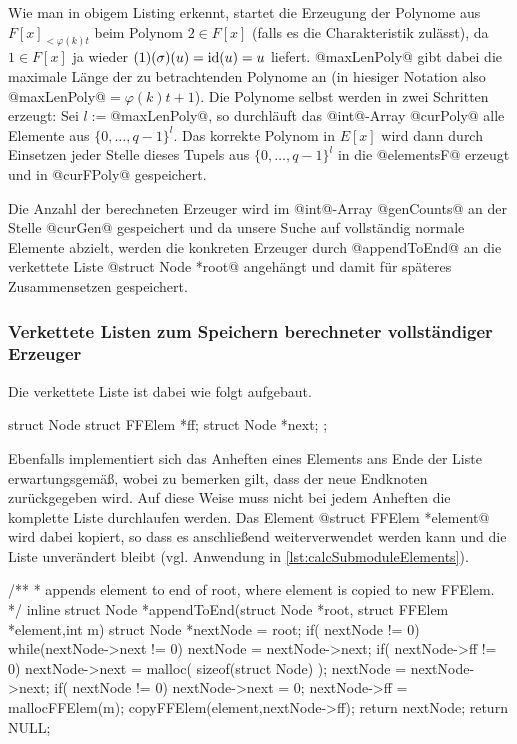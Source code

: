 Wie man in obigem Listing erkennt, startet die Erzeugung der Polynome aus 
$F[x]_{<\varphi(k)t}$ beim Polynom $2 \in F[x]$ (falls es die Charakteristik
zulässt), da $1\in F[x]$ ja wieder $(1)(\sigma)(u) = \operatorname{id}(u) = u$ liefert.
@maxLenPoly@ gibt dabei die maximale Länge der zu betrachtenden Polynome an (in
hiesiger Notation also @maxLenPoly@$= \varphi(k)t+1$). Die Polynome selbst
werden in zwei Schritten erzeugt: Sei $l := $@maxLenPoly@, so
durchläuft das @int@-Array @curPoly@ alle Elemente aus $\{0,\ldots,q-1\}^l$.
Das korrekte Polynom in $E[x]$ wird dann durch Einsetzen jeder Stelle 
dieses Tupels aus $\{0,\ldots,q-1\}^l$ in die @elementsF@ erzeugt und in 
@curFPoly@ gespeichert.

Die Anzahl der berechneten Erzeuger wird im @int@-Array @genCounts@ an der
Stelle @curGen@ gespeichert und da unsere Suche auf vollständig normale
Elemente abzielt, werden die konkreten Erzeuger durch @appendToEnd@ 
an die verkettete Liste @struct Node *root@ angehängt und 
damit für späteres Zusammensetzen gespeichert.


\subsubsection{Verkettete Listen zum Speichern berechneter vollständiger Erzeuger}

Die verkettete Liste ist dabei wie folgt aufgebaut.

\begin{ccode}[caption={[\texttt{struct Node} aus 
 \url{../Sage/enumeratePCNs.c}]Aus \url{../Sage/enumeratePCNs.c}},
  label=lst:structNode]
struct Node {
    struct FFElem *ff;
    struct Node *next;
};
\end{ccode}

Ebenfalls implementiert sich das Anheften eines Elements ans Ende der Liste 
erwartungsgemäß, wobei zu bemerken gilt, dass der neue Endknoten zurückgegeben 
wird.
Auf diese Weise muss nicht bei jedem Anheften die komplette Liste durchlaufen
werden. Das Element @struct FFElem *element@ wird dabei kopiert, so dass es
anschließend weiterverwendet werden kann und die Liste unverändert bleibt 
(vgl. Anwendung in \autoref{lst:calcSubmoduleElements}).

\begin{ccode}[caption={[\texttt{Node *appendToEnd} aus 
 \url{../Sage/enumeratePCNs.c}]Aus \url{../Sage/enumeratePCNs.c}},
  label=lst:appendToEnd]
/**
 * appends element to end of root, where element is copied to new FFElem.
 */
inline struct Node *appendToEnd(struct Node *root, struct FFElem *element,int m){
    struct Node *nextNode = root;
    if( nextNode != 0){
        while(nextNode->next != 0){
            nextNode = nextNode->next;
        }
        if( nextNode->ff != 0){
            nextNode->next = malloc( sizeof(struct Node) );
            nextNode = nextNode->next;
        }
        if( nextNode != 0){
            nextNode->next = 0;
            nextNode->ff = mallocFFElem(m);
            copyFFElem(element,nextNode->ff);
            return nextNode;
        }
    }
    return NULL;
}
\end{ccode}


